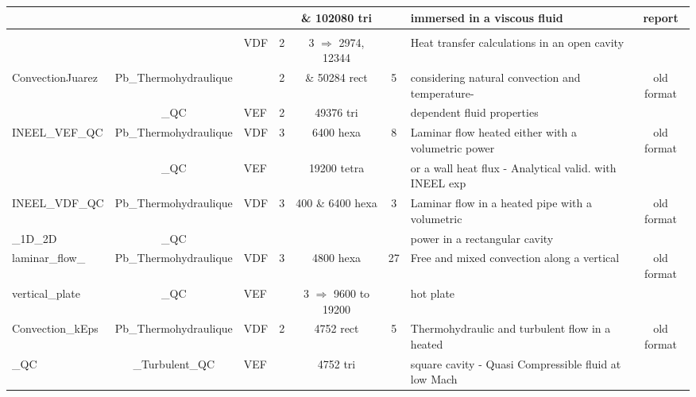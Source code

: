 \begin{table}[H]
\begin{centering}
\begin{tabular}{lclccclc}
\rowcolor{Goldenrod!20} & & & & \& 102080 tri & & immersed in a viscous fluid & report \\ \hline
\rowcolor{Peach} \multicolumn{8}{c}{\textbf{Dilatable Fluids}} \\
\hline
\rowcolor{Peach!20} & & VDF & 2 & 3 $\Rightarrow$ 2974, 12344  & & Heat transfer calculations in an open cavity & \\ 
\rowcolor{Peach!20}ConvectionJuarez & Pb\_Thermohydraulique & & 2 & \& 50284 rect & 5 & considering natural convection and temperature- & old format \\ 
\rowcolor{Peach!20} & \_QC & VEF & 2 & 49376 tri & & dependent fluid properties & \\ \hline
\rowcolor{Peach!20}INEEL\_VEF\_QC & Pb\_Thermohydraulique & VDF & 3 & 6400 hexa & 8 & Laminar flow heated either with a volumetric power & old format \\ 
\rowcolor{Peach!20} & \_QC & VEF &  & 19200 tetra & & or a wall heat flux - Analytical valid. with INEEL exp & \\ \hline
\rowcolor{Peach!20}INEEL\_VDF\_QC & Pb\_Thermohydraulique & VDF & 3 & 400 \& 6400 hexa & 3 & Laminar flow in a heated pipe with a volumetric & old format \\ 
\rowcolor{Peach!20}\_1D\_2D & \_QC & & & & & power in a rectangular cavity & \\ \hline
\rowcolor{Peach!20}laminar\_flow\_ & Pb\_Thermohydraulique & VDF & 3 & 4800 hexa & 27 & Free and mixed convection along a vertical  & old format \\
\rowcolor{Peach!20}vertical\_plate & \_QC & VEF & & 3 $\Rightarrow$ 9600 to 19200 & & hot plate & \\ \hline
\rowcolor{Peach!20}Convection\_kEps & Pb\_Thermohydraulique & VDF & 2 & 4752 rect & 5 & Thermohydraulic and turbulent flow in a heated  & old format \\
\rowcolor{Peach!20}\_QC & \_Turbulent\_QC & VEF & & 4752 tri & & square cavity - Quasi Compressible fluid at low Mach & \\ \hline


	\end{tabular}
\end{centering}
\end{table}

\newpage

